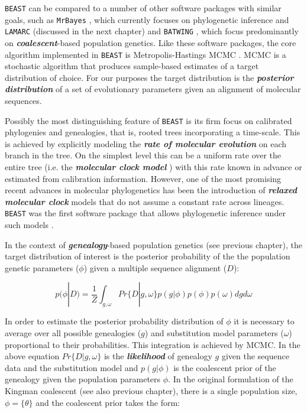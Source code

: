 \documentclass[cup7b, english]{cupbook}
\begin{document}
\texttt{BEAST} can be compared to a number of other software packages with
similar goals, such as \texttt{MrBayes} \cite{HR2001}, which
currently focuses on phylogenetic inference and  \texttt{LAMARC} \cite{Kuhner2006} (discussed in the next chapter)  and \texttt{BATWING}
\cite{WWB2003}, which focus predominantly on \textbf{\textit{coalescent}}-based population
genetics. Like these software packages, the core algorithm implemented
in \texttt{BEAST} is Metropolis-Hastings MCMC \cite{MRRTT1953,Hastings1970}.
MCMC is a stochastic algorithm that produces sample-based estimates
of a target distribution of choice. For our purposes the target distribution
is the  \textbf{\textit{posterior distribution}} of a set of evolutionary parameters
given an alignment of molecular sequences.

Possibly the most distinguishing feature of \texttt{BEAST} is its firm focus
on calibrated phylogenies and genealogies, that is, rooted trees incorporating
a time-scale. This is achieved by explicitly modeling the \textbf{\textit{rate of
molecular evolution}} on each branch in the tree. On the simplest level
this can be a uniform rate over the entire tree (i.e. the \textbf{\textit{molecular
clock model}} \cite{ZP1965}) with this rate known in advance or estimated
from calibration information. However, one of the most promising recent
advances in molecular phylogenetics has been the introduction of \textbf{\textit{relaxed
molecular clock}} models that do not assume a constant rate across
lineages\cite{TKP1998,YY2000,KTB2001,Sanderson2002,TK2002,AY2003}.
\texttt{BEAST} was the first software package that allows phylogenetic inference
under such models \cite{DHPR2006}.

In the context of \textbf{\textit{genealogy}}-based population genetics (see previous chapter), the target distribution of interest
is the posterior probability of the the population genetic parameters ($\phi$) given a
multiple sequence alignment ($D$):

\begin{equation}
p(\phi|D) = \frac{1}{Z}\int_{g,\omega} Pr\{D|g, \omega\}p(g|\phi)p(\phi)p(\omega)dgd\omega
\label{posterior-phi}
\end{equation}

In order to estimate the posterior probability distribution of $\phi$ it is necessary to average
over all possible genealogies ($g$) and substitution model parameters ($\omega$)
proportional to their probabilities. This integration is achieved by MCMC. In the above equation
$Pr\{D|g, \omega\}$ is the \textbf{\textit{likelihood}} of genealogy $g$ given the sequence data and the
substitution model \cite{F81} and $p(g|\phi)$ is the coalescent
prior of the genealogy given the population parameters $\phi$. In the original formulation
of the Kingman coalescent \cite{Kingman1982} (see also previous chapter), there is a single population size, $\phi = \{\theta\}$ and the
coalescent prior takes the form:
\end{document}
